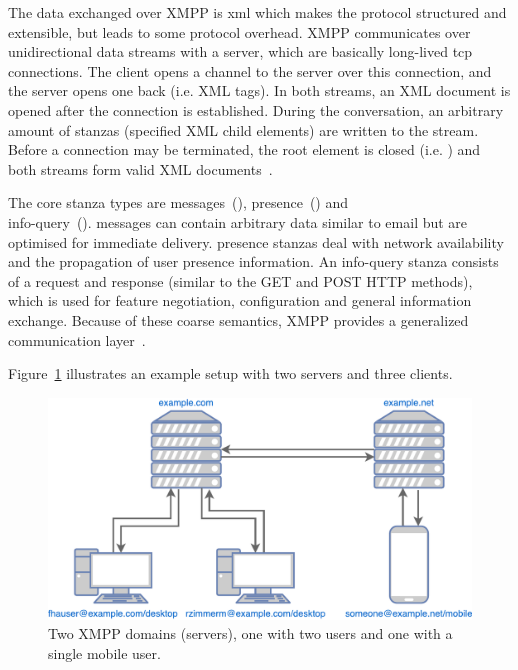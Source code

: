 The data exchanged over XMPP is \gls{xml} which makes the protocol structured and extensible, but leads to some protocol overhead.
XMPP communicates over unidirectional data streams with a server, which are basically long-lived \gls{tcp} connections.
The client opens a channel to the server over this connection, and the server opens one back (i.e.  XML tags). In both streams, an XML document is opened after the connection is established.
During the conversation, an arbitrary amount of \glspl{stanza} (specified XML child elements) are written to the stream.
Before a connection may be terminated, the root element is closed (i.e. ) and both streams form valid XML documents~\cite{rfc6120}\cite{professional-xmpp}.

The core \gls{stanza} types are \glspl{message}~(), \gls{presence}~() and\\
\gls{info-query}~().
\Glspl{message} can contain arbitrary data similar to email but are optimised for immediate delivery.
\Gls{presence} \glspl{stanza} deal with network availability and the propagation of user presence information.
An \gls{info-query} \gls{stanza} consists of a request and response (similar to the GET and POST HTTP methods), which is used for feature negotiation, configuration and general information exchange.
Because of these coarse semantics, XMPP provides a generalized communication layer~\cite{rfc6120}\cite{ieee-xplore-stream-xml-xmpp}.

Figure~\ref{fig:xmpp-overview} illustrates an example setup with two servers and three clients.

\begin{figure}[h]
	\centering
	\includegraphics[width=0.8\linewidth]{resources/xmpp_overview.pdf}
	\caption{Two XMPP domains (servers), one with two users and one with a single mobile user.}
	\label{fig:xmpp-overview}
\end{figure}

